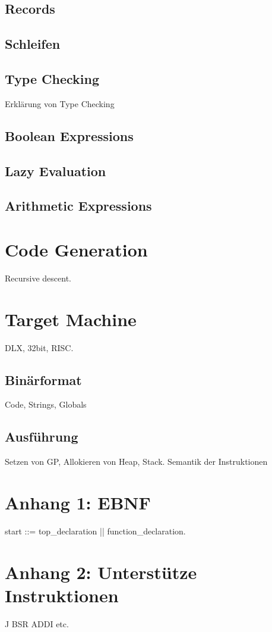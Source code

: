 \documentclass{article}
\begin{document}
	\subsection{Records}

	\subsection{Schleifen}

	\subsection{Type Checking}
	Erklärung von Type Checking

	\subsection{Boolean Expressions}

	\subsection{Lazy Evaluation}

	\subsection{Arithmetic Expressions}

	\section{Code Generation}
	Recursive descent.

	\section{Target Machine}
	DLX, 32bit, RISC.

	\subsection{Binärformat}
	Code, Strings, Globals

	\subsection{Ausführung}
	Setzen von GP, Allokieren von Heap, Stack. Semantik der Instruktionen

	\newpage
	\section{Anhang 1: EBNF}
	start ::= top\_declaration || function\_declaration.

	\newpage
	\section{Anhang 2: Unterstütze Instruktionen}
	J
	BSR
	ADDI
	etc.
\end{document}
